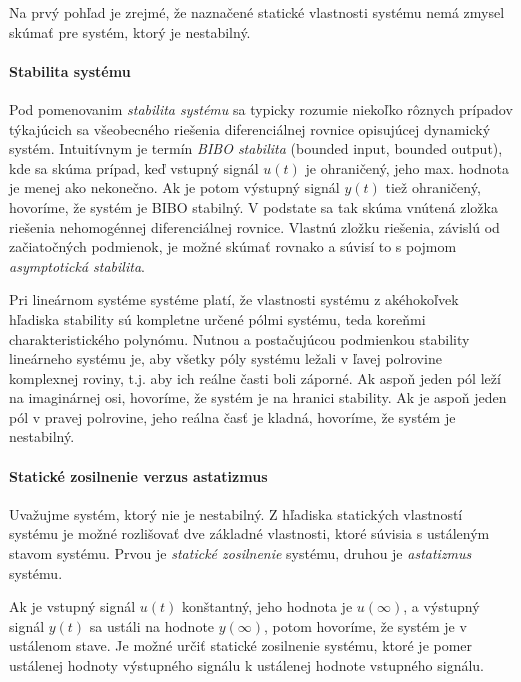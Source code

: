 \documentclass[a4paper, 10pt, ]{article}
\begin{document}
Na prvý pohľad je zrejmé, že naznačené statické vlastnosti systému nemá zmysel skúmať pre systém, ktorý je nestabilný.



\paragraph{Stabilita systému}

Pod pomenovanim \emph{stabilita systému} sa typicky rozumie niekoľko rôznych prípadov týkajúcich sa všeobecného riešenia diferenciálnej rovnice opisujúcej dynamický systém. Intuitívnym je termín \emph{BIBO stabilita} (bounded input, bounded output), kde sa skúma prípad, keď vstupný signál $u(t)$ je ohraničený, jeho max. hodnota je menej ako nekonečno. Ak je potom výstupný signál $y(t)$ tiež ohraničený, hovoríme, že systém je BIBO stabilný. V podstate sa tak skúma vnútená zložka riešenia nehomogénnej diferenciálnej rovnice. Vlastnú zložku riešenia, závislú od začiatočných podmienok, je možné skúmať rovnako a súvisí to s pojmom \emph{asymptotická stabilita}. 

\smallskip

Pri lineárnom systéme systéme platí, že vlastnosti systému z akéhokoľvek hľadiska stability sú kompletne určené pólmi systému, teda koreňmi charakteristického polynómu. Nutnou a postačujúcou podmienkou stability lineárneho systému je, aby všetky póly systému ležali v ľavej polrovine komplexnej roviny, t.j. aby ich reálne časti boli záporné. Ak aspoň jeden pól leží na imaginárnej osi, hovoríme, že systém je na hranici stability. Ak je aspoň jeden pól v pravej polrovine, jeho reálna časť je kladná, hovoríme, že systém je nestabilný.




\paragraph{Statické zosilnenie verzus astatizmus}

Uvažujme systém, ktorý nie je nestabilný. Z hľadiska statických vlastností systému je možné rozlišovať dve základné vlastnosti, ktoré súvisia s ustáleným stavom systému. Prvou je \emph{statické zosilnenie} systému, druhou je \emph{astatizmus} systému.

Ak je vstupný signál $u(t)$ konštantný, jeho hodnota je $u(\infty)$, a výstupný signál $y(t)$ sa ustáli na hodnote $y(\infty)$, potom hovoríme, že systém je v ustálenom stave. Je možné určiť statické zosilnenie systému, ktoré je pomer ustálenej hodnoty výstupného signálu k ustálenej hodnote vstupného signálu.
\end{document}
